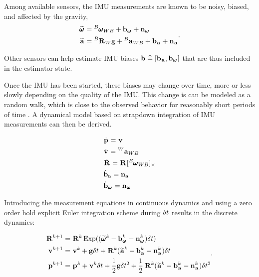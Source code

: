Among available sensors, the IMU measurements are known to be noisy, biased, and affected by the gravity,
%
\begin{equation}
    \begin{split}
    \prescript{}{}{\widetilde{\pmb{\omega}}}_{} &= \prescript{B}{}{\pmb{\omega}}_{WB} + {\bf b}_{\prescript{}{}{\pmb{\omega}}_{}} + {\bf n}_{\prescript{}{}{\pmb{\omega}}_{}} 
    \\
    \prescript{}{}{\widetilde{{\bf a}}}_{}    &= \prescript{B}{}{{\bf R}}_{W} {\bf g} + \prescript{B}{}{{\bf a}}_{WB} + {\bf b}_{\prescript{}{}{{\bf a}}_{}} + {\bf n}_{\prescript{}{}{{\bf a}}_{}} 
    \end{split}.
    \label{eq:imu_meas_model}
\end{equation}
    
Other sensors can help estimate IMU biases ${\bf b} \triangleq [{\bf b}_{\prescript{}{}{{\bf a}}_{}}, {\bf b}_{\prescript{}{}{\pmb{\omega}}_{}}]$ that are thus included in the estimator state.


Once the IMU has been started, these biases may change over time, more or less slowly depending on the quality of the IMU. This change is can be modeled 
as a random walk, which is close to the observed behavior for reasonably short periods of time \cite{hussen2015low}.
A dynamical model based on strapdown integration of IMU measurements can then be derived.

\begin{align}
    &\dot{\prescript{}{}{{\bf p}}_{}} = \prescript{}{}{{\bf v}}_{} \\
    &\dot{\prescript{}{}{{\bf v}}_{}} = \prescript{W}{}{{\bf a}}_{WB} \\
    &\dot{\prescript{}{}{{\bf R}}_{}} = \prescript{}{}{{\bf R}}_{} [\prescript{B}{}{\pmb{\omega}}_{WB}]_{\times} \\
    &\dot{{\bf b}}_{{\bf a}} = {\bf n}_{{\bf a}} \\
    &\dot{{\bf b}}_{\prescript{}{}{\pmb{\omega}}_{}} = {\bf n}_{\prescript{}{}{\pmb{\omega}}_{}} \\
    \label{eq:imu_dyn_conti}
\end{align}

Introducing the measurement equations  in continuous dynamics  and using a zero order hold
explicit Euler integration scheme during $\delta t$ results in the discrete dynamics:

\begin{equation}
    \begin{split}
    \prescript{}{}{{\bf R}}_{}^{k+1}  &= \prescript{}{}{{\bf R}}_{}^{k}\operatorname*{Exp}((\prescript{}{}{\widetilde{\pmb{\omega}}}_{}^k - {\bf b}_{\prescript{}{}{\pmb{\omega}}_{}}^k - {\bf n}_{\prescript{}{}{\pmb{\omega}}_{}}^k)\delta t)
    \\
    \prescript{}{}{{\bf v}}_{}^{k+1}  &= \prescript{}{}{{\bf v}}_{}^{k} + {\bf g} \delta t + \prescript{}{}{{\bf R}}_{}^{k}(\prescript{}{}{\widetilde{{\bf a}}}_{}^k - {\bf b}_{\prescript{}{}{{\bf a}}_{}}^k - {\bf n}_{\prescript{}{}{{\bf a}}_{}}^k)\delta t
    \\
    \prescript{}{}{{\bf p}}_{}^{k+1} &= \prescript{}{}{{\bf p}}_{}^{k} + \prescript{}{}{{\bf v}}_{}^{k}\delta t + \frac{1}{2}{\bf g} \delta t^2 
    + \frac{1}{2}\prescript{}{}{{\bf R}}_{}^{k}(\prescript{}{}{\widetilde{{\bf a}}}_{}^k - {\bf b}_{\prescript{}{}{{\bf a}}_{}}^k - {\bf n}_{\prescript{}{}{{\bf a}}_{}}^k)\delta t^2
    \end{split}.
    \label{eq:imu_dyn_disc}
\end{equation}
    
